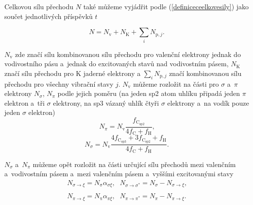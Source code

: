 Celkovou sílu přechodu $N$ také můžeme vyjádřit podle (\ref{definiceceelkovesily}) jako součet jednotlivých příspěvků $t$

\begin{equation}
N = N_\mathrm{v} + N_\mathrm{K} + \sum_i N_{\mathrm{p},j} \text{.}
\end{equation}

$N_\mathrm{v}$ zde značí sílu kombinovanou sílu přechodu pro valenční elektrony jednak do vodivostního pásu a~jednak do excitovaných stavů nad vodivostním pásem, $N_\mathrm{K}$ značí sílu přechodu pro K jaderné elektrony a $\sum_i N_{\mathrm{p},j}$ značí kombinovanou sílu přechodu pro všechny vibrační stavy $j$. $N_\mathrm{v}$ můžeme rozložit na části pro $\sigma$ a~$\pi$ elektrony $N_\sigma$, $N_\pi$ podle jejich poměru (na jeden sp2 atom uhlíku připadá jeden $\pi$ elektron a~tři $\sigma$ elektrony, na sp3 vázaný uhlík čtyři $\sigma$ elektrony a~na vodík pouze jeden $\sigma$  elektron)
\begin{equation}
N_\pi = N_\mathrm{v} \frac{f_\mathrm{C_{sp2}}}{4f_\mathrm{C} + f_\mathrm{H}}  \text{,}
\end{equation}
\begin{equation}
N_\sigma = N_\mathrm{v} \frac{4f_\mathrm{C_{sp3}} + 3f_\mathrm{C_{sp2}} + f_\mathrm{H}}{4f_\mathrm{C} + f_\mathrm{H}}  \text{.}
\end{equation}

$N_\sigma$ a~$N_\pi$ můžeme opět rozložit na části určující sílu přechodů mezi valenčním a~vodivostním pásem a~mezi valenčním pásem a~vyššími excitovanými stavy
\begin{equation}
\begin{array}{lr}
N_{\sigma \rightarrow \xi} = N_\mathrm{\sigma} \alpha_{\sigma\xi} \text{,} &
N_{\sigma \rightarrow \sigma^*} = N_\sigma - N_{\sigma \rightarrow \xi} \text{,} \\
\end{array}
\end{equation}
\begin{equation}
\begin{array}{lr}
N_{\pi \rightarrow \xi} = N_\mathrm{\pi} \alpha_{\pi\xi} \text{,} &
N_{\pi \rightarrow \pi^*} = N_\pi - N_{\pi \rightarrow \xi} \text{.} \\
\end{array}
\end{equation}

